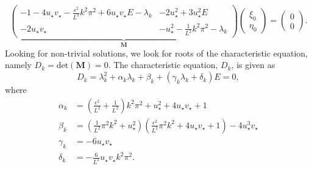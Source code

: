 \begin{equation}
\underbrace{\begin{pmatrix}-1-4u_\star v_\star-\frac{\epsilon^2}{L^2}k^2\pi^2+6u_\star v_\star E-\lambda_k&-2u_\star^2+3u_\star^2E\\-2u_\star v_\star&-u_\star^2-\frac{1}{L^2}k^2\pi^2-\lambda_k \end{pmatrix}}_{\textbf{M}}\begin{pmatrix}\xi_0\\\eta_0\end{pmatrix}=\begin{pmatrix}0\\0\end{pmatrix}.
\end{equation}
Looking for non-trivial solutions, we look for roots of the characteristic equation, namely $D_k=\text{det}(\textbf{M})=0$. The characteristic equation, $D_k$, is given as
\begin{equation}\label{characdist}
  D_k=\lambda_k^2+\alpha_k\lambda_k+\beta_k+(\gamma_k\lambda_k+\delta_k)E=0,
\end{equation}
where
\begin{align}
\alpha_k&=\left(\frac{\epsilon^2}{L^2}+\frac{1}{L^2}\right)k^2\pi^2+u_\star^2+4u_\star v_\star+1\\
\beta_k&=\left(\frac{1}{L^2}\pi^2k^2+u_\star^2\right)\left(\frac{\epsilon^2}{L^2}\pi^2k^2+4u_\star v_\star+1\right)-4u_\star^3v_\star\\
\gamma_k&=-6u_\star v_\star\\
\delta_k&=-\frac{6}{L^2}u_\star v_\star k^2\pi^2.
\end{align}

